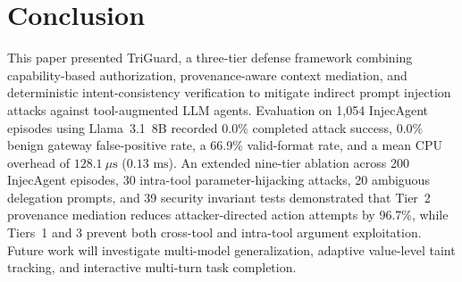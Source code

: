 \documentclass[conference]{IEEEtran}
\begin{document}
\section{Conclusion}
This paper presented TriGuard, a three-tier defense framework combining capability-based authorization, provenance-aware context mediation, and deterministic intent-consistency verification to mitigate indirect prompt injection attacks against tool-augmented LLM agents. Evaluation on 1,054 InjecAgent episodes using Llama~3.1~8B recorded 0.0\% completed attack success, 0.0\% benign gateway false-positive rate, a 66.9\% valid-format rate, and a mean CPU overhead of $128.1~\mu\text{s}$ ($0.13\text{ ms}$). An extended nine-tier ablation across 200 InjecAgent episodes, 30 intra-tool parameter-hijacking attacks, 20 ambiguous delegation prompts, and 39 security invariant tests demonstrated that Tier~2 provenance mediation reduces attacker-directed action attempts by 96.7\%, while Tiers~1 and 3 prevent both cross-tool and intra-tool argument exploitation. Future work will investigate multi-model generalization, adaptive value-level taint tracking, and interactive multi-turn task completion.
\end{document}
